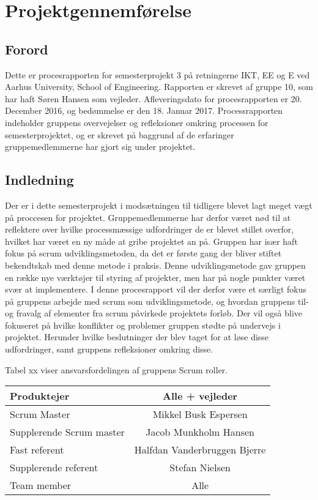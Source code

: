 \chapter{Projektgennemførelse}
\section{Forord}
Dette er procesrapporten for semesterprojekt 3 på retningerne IKT, EE og E ved Aarhus University, School of Engineering. Rapporten er skrevet af gruppe 10, som
har haft Søren Hansen som vejleder. Afleveringsdato for procesrapporten er 20. December 2016, og bedømmelse er den 18. Januar 2017.
Processrapporten indeholder gruppens overvejelser og refleksioner omkring processen for semesterprojektet, og er skrevet på baggrund af de erfaringer
gruppemedlemmerne har gjort sig under projektet.    

\section{Indledning}
Der er i dette semesterprojekt i modsætningen til tidligere blevet lagt meget vægt på proccesen for projektet. Gruppemedlemmerne har derfor været nød til at 
reflektere over hvilke processmæssige udfordringer de er blevet stillet overfor, hvilket har været en ny måde at gribe projektet an på.
Gruppen har især haft fokus på scrum udviklingsmetoden, da det er første gang der bliver stiftet bekendtskab med denne metode i praksis. Denne udviklingsmetode
gav gruppen en række nye værktøjer til styring af projekter, men har på nogle punkter været svær at implementere. I denne procesrapport vil der derfor være et 
særligt fokus på gruppens arbejde med scrum som udviklingsmetode, og hvordan gruppens til- og fravalg af elementer fra scrum påvirkede projektets forløb.
Der vil også blive fokuseret på hvilke konflikter og problemer gruppen stødte på undervejs i projektet. Herunder hvilke beslutninger der blev taget for at 
løse disse udfordringer, samt gruppens refleksioner omkring disse.

Tabel xx viser ansvarsfordelingen af gruppens Scrum roller. \\

\begin{tabular}{| l | c |}
\hline
Produktejer & Alle + vejleder\\\hline
Scrum Master & Mikkel Busk Espersen\\\hline
Supplerende Scrum master & Jacob Munkholm Hansen\\\hline
Fast referent & Halfdan Vanderbruggen Bjerre\\\hline
Supplerende referent & Stefan Nielsen\\\hline
Team member & Alle\\\hline
\end{tabular}

